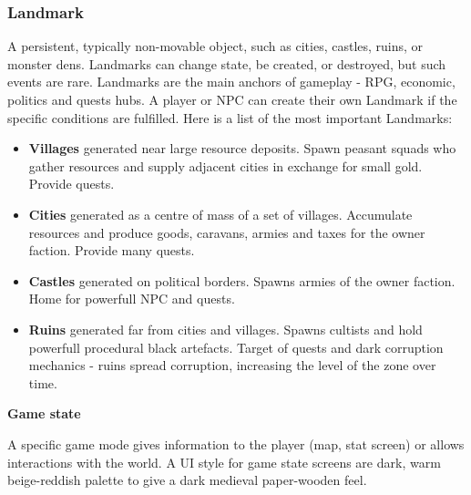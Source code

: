 \subsubsection{Landmark} 

A persistent, typically non-movable object, such as cities, castles, ruins, or monster dens. Landmarks can change state, be created, or destroyed, but such events are rare. Landmarks are the main anchors of gameplay - RPG, economic, politics and quests hubs. A player or NPC can create their own Landmark if the specific conditions are fulfilled. Here is a list of the most important Landmarks:

\begin{itemize}

\item \textbf{Villages} generated near large resource deposits. Spawn peasant squads who gather resources and supply adjacent cities in exchange for small gold. Provide quests.

\item \textbf{Cities} generated as a centre of mass of a set of villages. Accumulate resources and produce goods, caravans, armies and taxes for the owner faction. Provide many quests.

\item \textbf{Castles} generated on political borders. Spawns armies of the owner faction. Home for powerfull NPC and quests.

\item \textbf{Ruins} generated far from cities and villages. Spawns cultists and hold powerfull procedural black artefacts. Target of quests and dark corruption mechanics - ruins spread corruption, increasing the level of the zone over time.

\end{itemize}

\textbf{Game state}

 A specific game mode gives information to the player (map, stat screen) or allows interactions with the world. A UI style for game state screens are dark, warm beige-reddish palette to give a dark medieval paper-wooden feel.
 
